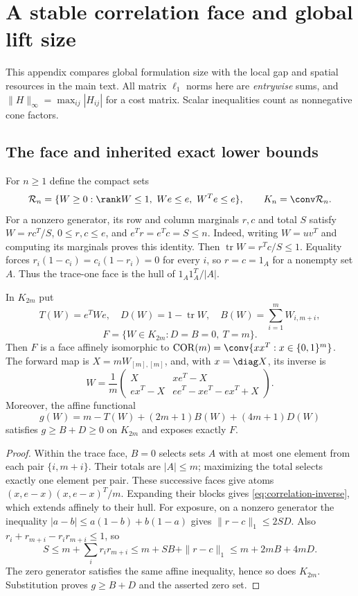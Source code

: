 \section{A stable correlation face and global lift size}\label{app:rank-one}
This appendix compares global formulation size with the local gap and
spatial resources in the main text. All matrix $\ell_1$ norms here are
\emph{entrywise} sums, and $\|H\|_\infty=\max_{ij}|H_{ij}|$ for a cost
matrix. Scalar inequalities count as nonnegative cone factors.

\subsection{The face and inherited exact lower bounds}
For $n\ge1$ define the compact sets
\[
 \mathcal R_n=\{W\ge0:\rank W\le1,\ We\le e,\ W^Te\le e\},
 \qquad K_n=\conv\mathcal R_n.
\]
For a nonzero generator, its row and column marginals $r,c$ and total
$S$ satisfy $W=rc^T/S$, $0\le r,c\le e$, and $e^Tr=e^Tc=S\le n$.
Indeed, writing $W=uv^T$ and computing its marginals proves this identity.
Then $\operatorname{tr}W=r^Tc/S\le1$. Equality forces
$r_i(1-c_i)=c_i(1-r_i)=0$ for every $i$, so $r=c=1_A$ for a nonempty
set $A$. Thus the trace-one face is the hull of $1_A1_A^T/|A|$.

\begin{proposition}\label{prop:correlation-face}
In $K_{2m}$ put
\[
 T(W)=e^TWe,\quad D(W)=1-\operatorname{tr}W,\quad
 B(W)=\sum_{i=1}^m W_{i,m+i},
\]
\[
 F=\{W\in K_{2m}:D=B=0,\ T=m\}.
\]
Then $F$ is a face affinely isomorphic to
$\operatorname{COR}(m)=\conv\{xx^T:x\in\{0,1\}^m\}$.
The forward map is $X=mW_{[m],[m]}$, and, with $x=\diag X$, its inverse is
\begin{equation}\label{eq:correlation-inverse}
 W=\frac1m\begin{pmatrix}
 X&xe^T-X\\ ex^T-X&ee^T-xe^T-ex^T+X
 \end{pmatrix}.
\end{equation}
Moreover, the affine functional
\[
 g(W)=m-T(W)+(2m+1)B(W)+(4m+1)D(W)
\]
satisfies $g\ge B+D\ge0$ on $K_{2m}$ and exposes exactly $F$.
\end{proposition}
\begin{proof}
Within the trace face, $B=0$ selects sets $A$ with at most one element
from each pair $\{i,m+i\}$. Their totals are $|A|\le m$; maximizing the
total selects exactly one element per pair. These successive faces give
atoms $(x,e-x)(x,e-x)^T/m$. Expanding their blocks gives
\eqref{eq:correlation-inverse}, which extends affinely to their hull.
For exposure, on a nonzero generator the inequality
$|a-b|\le a(1-b)+b(1-a)$ gives $\|r-c\|_1\le2SD$.
Also $r_i+r_{m+i}-r_ir_{m+i}\le1$, so
\[
 S\le m+\sum_i r_ir_{m+i}\le m+SB+\|r-c\|_1
       \le m+2mB+4mD.
\]
The zero generator satisfies the same affine inequality, hence so does
$K_{2m}$. Substitution proves $g\ge B+D$ and the asserted zero set.
\end{proof}

